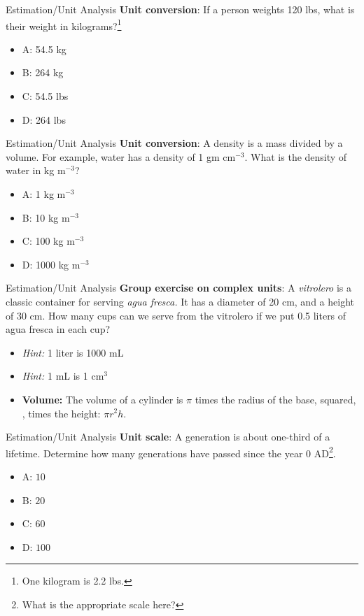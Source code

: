\documentclass{beamer}
\begin{document}
\begin{frame}{Estimation/Unit Analysis}
\textbf{Unit conversion}: If a person weights 120 lbs, what is their weight in kilograms?\footnote{One kilogram is 2.2 lbs.}
\begin{itemize}
\item A: 54.5 kg
\item B: 264 kg
\item C: 54.5 lbs
\item D: 264 lbs
\end{itemize}
\end{frame}

\begin{frame}{Estimation/Unit Analysis}
\textbf{Unit conversion}: A \alert{density} is a mass divided by a volume.  For example, water has a density of 1 gm cm$^{-3}$.  What is the density of water in kg m$^{-3}$?
\begin{itemize}
\item A: 1 kg m$^{-3}$
\item B: 10 kg m$^{-3}$
\item C: 100 kg m$^{-3}$
\item D: 1000 kg m$^{-3}$
\end{itemize}
\end{frame}

\begin{frame}{Estimation/Unit Analysis}
\textbf{Group exercise on complex units}: A \textit{vitrolero} is a classic container for serving \textit{agua fresca.}  It has a diameter of 20 cm, and a height of 30 cm.  How many cups can we serve from the vitrolero if we put 0.5 liters of agua fresca in each cup?
\begin{itemize}
\item \textit{Hint:} 1 liter is 1000 mL
\item \textit{Hint:} 1 mL is 1 cm$^3$
\item \textbf{Volume:} The volume of a cylinder is $\pi$ times the radius of the base, squared, , times the height: $\pi r^2 h$.
\end{itemize}
\end{frame}

\begin{frame}{Estimation/Unit Analysis}
\textbf{Unit scale}: A generation is about one-third of a lifetime. Determine how many generations have passed since the year 0 AD\footnote{What is the appropriate scale here?}.
\begin{itemize}
\item A: $10$
\item B: $20$
\item C: $60$
\item D: $100$
\end{itemize}
\end{frame}
\end{document}

